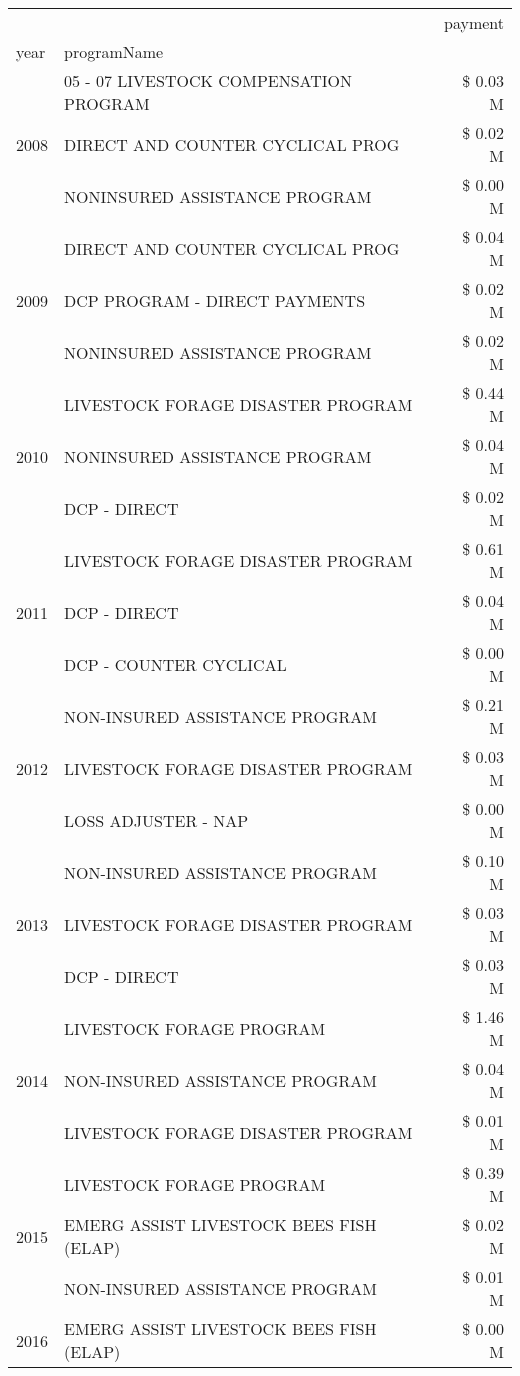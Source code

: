 \begin{tabular}{llr}
\toprule
 &  & payment \\
year & programName &  \\
\midrule
\multirow[t]{3}{*}{2008} & 05 - 07 LIVESTOCK COMPENSATION PROGRAM & \$ 0.03 M \\
 & DIRECT AND COUNTER CYCLICAL PROG & \$ 0.02 M \\
 & NONINSURED ASSISTANCE PROGRAM & \$ 0.00 M \\
\cline{1-3}
\multirow[t]{3}{*}{2009} & DIRECT AND COUNTER CYCLICAL PROG & \$ 0.04 M \\
 & DCP PROGRAM - DIRECT PAYMENTS & \$ 0.02 M \\
 & NONINSURED ASSISTANCE PROGRAM & \$ 0.02 M \\
\cline{1-3}
\multirow[t]{3}{*}{2010} & LIVESTOCK FORAGE DISASTER PROGRAM & \$ 0.44 M \\
 & NONINSURED ASSISTANCE PROGRAM & \$ 0.04 M \\
 & DCP - DIRECT & \$ 0.02 M \\
\cline{1-3}
\multirow[t]{3}{*}{2011} & LIVESTOCK FORAGE DISASTER PROGRAM & \$ 0.61 M \\
 & DCP - DIRECT & \$ 0.04 M \\
 & DCP - COUNTER CYCLICAL & \$ 0.00 M \\
\cline{1-3}
\multirow[t]{3}{*}{2012} & NON-INSURED ASSISTANCE PROGRAM & \$ 0.21 M \\
 & LIVESTOCK FORAGE DISASTER PROGRAM & \$ 0.03 M \\
 & LOSS ADJUSTER - NAP & \$ 0.00 M \\
\cline{1-3}
\multirow[t]{3}{*}{2013} & NON-INSURED ASSISTANCE PROGRAM & \$ 0.10 M \\
 & LIVESTOCK FORAGE DISASTER PROGRAM & \$ 0.03 M \\
 & DCP - DIRECT & \$ 0.03 M \\
\cline{1-3}
\multirow[t]{3}{*}{2014} & LIVESTOCK FORAGE PROGRAM & \$ 1.46 M \\
 & NON-INSURED ASSISTANCE PROGRAM & \$ 0.04 M \\
 & LIVESTOCK FORAGE DISASTER PROGRAM & \$ 0.01 M \\
\cline{1-3}
\multirow[t]{3}{*}{2015} & LIVESTOCK FORAGE PROGRAM & \$ 0.39 M \\
 & EMERG ASSIST LIVESTOCK BEES FISH (ELAP) & \$ 0.02 M \\
 & NON-INSURED ASSISTANCE PROGRAM & \$ 0.01 M \\
\cline{1-3}
\multirow[t]{2}{*}{2016} & EMERG ASSIST LIVESTOCK BEES FISH (ELAP) & \$ 0.00 M \\

\end{tabular}
